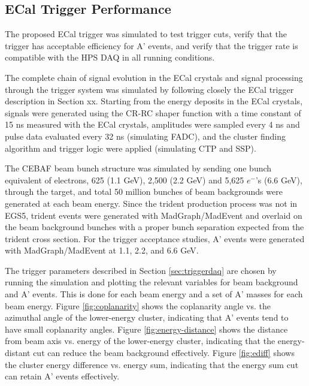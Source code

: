 \subsection{ECal Trigger Performance}

The proposed ECal trigger was simulated to test trigger cuts, verify
that the trigger has acceptable efficiency for A' events, and verify 
that the trigger rate is compatible with the HPS DAQ in all running conditions. 

The complete chain of signal evolution in the ECal crystals and 
signal processing through the trigger system was simulated
by following closely the ECal trigger description in Section xx. 
Starting from the energy deposits in the ECal crystals, signals were 
generated using the CR-RC shaper function with a time constant of 15 ns
measured with the ECal crystals, amplitudes were sampled every 4 ns
and pulse data evaluated every 32 ns (simulating FADC), and the cluster 
finding algorithm and trigger logic were applied (simulating CTP and SSP). 

The CEBAF beam bunch structure was simulated by sending one bunch 
equivalent of electrons, 
625 (1.1 GeV), 2,500 (2.2 GeV) and 5,625 $e^-$'s (6.6 GeV), through 
the target, and total 50 million bunches of beam backgrounds were 
generated at each beam energy. Since the trident production process 
was not in EGS5, trident events were generated with MadGraph/MadEvent 
and overlaid on the beam background bunches with a proper bunch separation 
expected from the trident cross section.
For the trigger acceptance studies, A' events were generated with 
MadGraph/MadEvent at 1.1, 2.2, and 6.6 GeV.

The trigger parameters described in Section \ref{sec:triggerdaq} are 
chosen by running the simulation and plotting the relevant variables 
for beam background and A' events. This is done for each beam energy 
and a set of A' masses for each beam energy. 
Figure \ref{fig:coplanarity} shows the coplanarity angle vs. the azimuthal 
angle of the lower-energy cluster, indicating that A' events 
tend to have small coplanarity angles. Figure \ref{fig:energy-distance} shows
the distance from beam axis vs. energy of the lower-energy cluster,
indicating that the energy-distant cut can reduce the beam background effectively.
Figure \ref{fig:ediff} shows the cluster energy difference vs. energy sum,
indicating that the energy sum cut can retain A' events effectively.       


